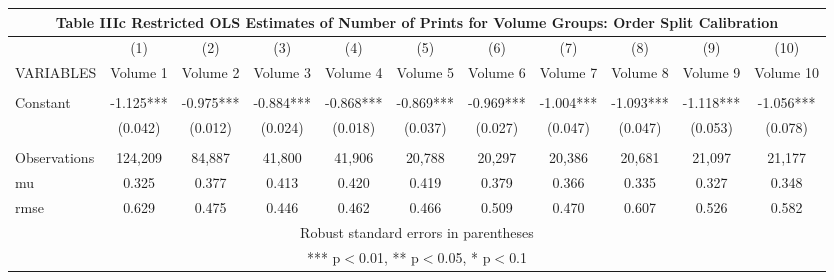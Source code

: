 \documentclass[]{article}
\begin{document}
\begin{tabular}{lcccccccccc}
\multicolumn{11}{c}{Table IIIc Restricted OLS Estimates of Number of Prints for Volume Groups: Order Split Calibration} \\ \hline
 & (1) & (2) & (3) & (4) & (5) & (6) & (7) & (8) & (9) & (10) \\
VARIABLES & Volume 1 & Volume 2 & Volume 3 & Volume 4 & Volume 5 & Volume 6 & Volume 7 & Volume 8 & Volume 9 & Volume 10 \\ \hline
 &  &  &  &  &  &  &  &  &  &  \\
Constant & -1.125*** & -0.975*** & -0.884*** & -0.868*** & -0.869*** & -0.969*** & -1.004*** & -1.093*** & -1.118*** & -1.056*** \\
 & (0.042) & (0.012) & (0.024) & (0.018) & (0.037) & (0.027) & (0.047) & (0.047) & (0.053) & (0.078) \\
 &  &  &  &  &  &  &  &  &  &  \\
Observations & 124,209 & 84,887 & 41,800 & 41,906 & 20,788 & 20,297 & 20,386 & 20,681 & 21,097 & 21,177 \\
mu & 0.325 & 0.377 & 0.413 & 0.420 & 0.419 & 0.379 & 0.366 & 0.335 & 0.327 & 0.348 \\
 rmse & 0.629 & 0.475 & 0.446 & 0.462 & 0.466 & 0.509 & 0.470 & 0.607 & 0.526 & 0.582 \\ \hline
\multicolumn{11}{c}{ Robust standard errors in parentheses} \\
\multicolumn{11}{c}{ *** p$<$0.01, ** p$<$0.05, * p$<$0.1} \\
\end{tabular}
\end{document}
